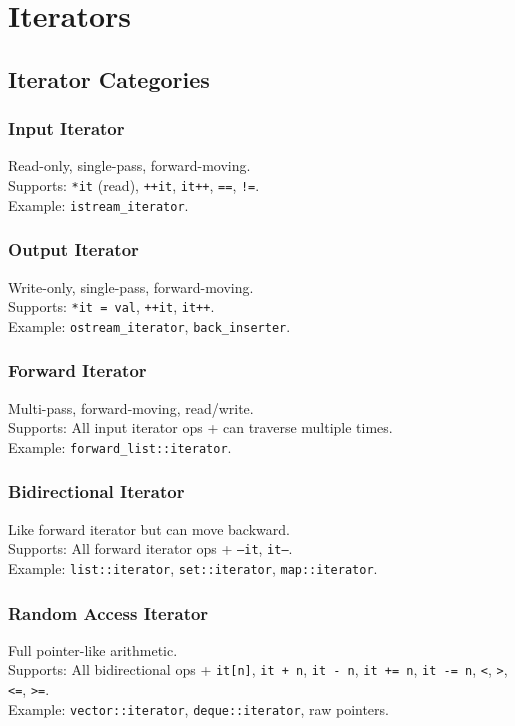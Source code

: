 \section{Iterators}

\subsection{Iterator Categories}

\subsubsection{Input Iterator}
Read-only, single-pass, forward-moving.\\
Supports: \texttt{*it} (read), \texttt{++it}, \texttt{it++}, \texttt{==}, \texttt{!=}.\\
Example: \texttt{istream\_iterator}.

\subsubsection{Output Iterator}
Write-only, single-pass, forward-moving.\\
Supports: \texttt{*it = val}, \texttt{++it}, \texttt{it++}.\\
Example: \texttt{ostream\_iterator}, \texttt{back\_inserter}.

\subsubsection{Forward Iterator}
Multi-pass, forward-moving, read/write.\\
Supports: All input iterator ops + can traverse multiple times.\\
Example: \texttt{forward\_list::iterator}.

\subsubsection{Bidirectional Iterator}
Like forward iterator but can move backward.\\
Supports: All forward iterator ops + \texttt{--it}, \texttt{it--}.\\
Example: \texttt{list::iterator}, \texttt{set::iterator}, \texttt{map::iterator}.

\subsubsection{Random Access Iterator}
Full pointer-like arithmetic.\\
Supports: All bidirectional ops + \texttt{it[n]}, \texttt{it + n}, \texttt{it - n}, \texttt{it += n}, \texttt{it -= n}, \texttt{<}, \texttt{>}, \texttt{<=}, \texttt{>=}.\\
Example: \texttt{vector::iterator}, \texttt{deque::iterator}, raw pointers.\\

